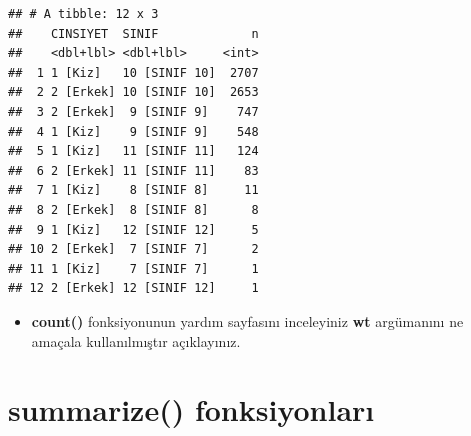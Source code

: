 \documentclass[
  oneside]{book}
\providecommand{\tightlist}{%
  \setlength{\itemsep}{0pt}\setlength{\parskip}{0pt}}
\begin{document}
\begin{verbatim}
## # A tibble: 12 x 3
##    CINSIYET  SINIF             n
##    <dbl+lbl> <dbl+lbl>     <int>
##  1 1 [Kiz]   10 [SINIF 10]  2707
##  2 2 [Erkek] 10 [SINIF 10]  2653
##  3 2 [Erkek]  9 [SINIF 9]    747
##  4 1 [Kiz]    9 [SINIF 9]    548
##  5 1 [Kiz]   11 [SINIF 11]   124
##  6 2 [Erkek] 11 [SINIF 11]    83
##  7 1 [Kiz]    8 [SINIF 8]     11
##  8 2 [Erkek]  8 [SINIF 8]      8
##  9 1 [Kiz]   12 [SINIF 12]     5
## 10 2 [Erkek]  7 [SINIF 7]      2
## 11 1 [Kiz]    7 [SINIF 7]      1
## 12 2 [Erkek] 12 [SINIF 12]     1
\end{verbatim}

\begin{itemize}
\tightlist
\item
  \textbf{count()} fonksiyonunun yardım sayfasını inceleyiniz \textbf{wt} argümanını ne amaçala kullanılmıştır açıklayınız.
\end{itemize}

\hypertarget{summarize-fonksiyonlarux131}{%
\section{summarize() fonksiyonları}\label{summarize-fonksiyonlarux131}}
\end{document}
